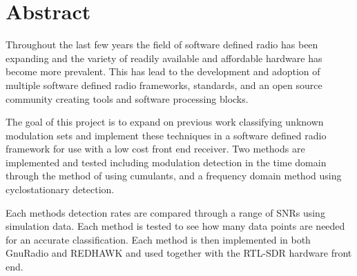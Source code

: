 \chapter{Abstract}

Throughout the last few years the field of software defined radio has been
expanding and the variety of readily available and affordable hardware has
become more prevalent.  This has lead to the development and adoption of
multiple software defined radio frameworks, standards, and an open source
community creating tools and software processing blocks.  

The goal of this project is to expand on previous work classifying unknown
modulation sets and implement these techniques in a software defined radio
framework for use with a low cost front end receiver.  Two methods are
implemented and tested including modulation detection in the time domain through
the method of using cumulants, and a frequency domain method using
cyclostationary detection.

Each methods detection rates are compared through a range of SNRs using
simulation data.  Each method is tested to see how many data points are needed
for an accurate classification. Each method is then implemented in both GnuRadio
and REDHAWK and used together with the RTL-SDR hardware front end. 
